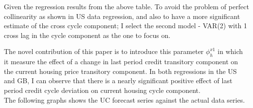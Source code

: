 \documentclass[fleqn]{article}
\begin{document}
\begin{outline}[enumerate]
\begin{landscape}
\begin{table}
\begin{center}
				\end{center}
			\end{table}
			
		\end{landscape}
		
		\clearpage
		
		Given the regression results from the above table. To avoid the problem of perfect collinearity as shown in US data regression, and also to have a more significant estimate of the cross cycle component; I select the second model - VAR(2) with 1 cross lag in the cycle component as the one to focus on.
		
		The novel contribution of this paper is to introduce this parameter $\phi^{x1}_h$ in which it measure the effect of a change in last period credit transitory component on the current housing price transitory component. In both regressions in the US and GB, I can observe that there is a nearly significant positive effect of last period credit cycle deviation on current housing cycle component.
		\\
		
		The following graphs shows the UC forecast series against the actual data series.
		

\end{outline}
\end{document}
